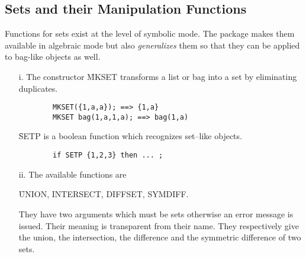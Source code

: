 \subsection{Sets and their Manipulation Functions}
Functions for sets exist at the level of symbolic mode. The
package makes them available in algebraic mode but also {\em generalizes}
them so that they can be applied to bag-like objects as well.
\begin{itemize}
\item[i.]
The constructor \f{MKSET} transforms a list or bag into a set by eliminating
duplicates.
\begin{verbatim}
        MKSET({1,a,a}); ==> {1,a}
        MKSET bag(1,a,1,a); ==> bag(1,a)
\end{verbatim}

\f{SETP} is a boolean function which recognizes set--like objects.
\begin{verbatim}
        if SETP {1,2,3} then ... ;
\end{verbatim}
\item[ii.]
The available functions are
\begin{center}
\f{UNION, INTERSECT, DIFFSET, SYMDIFF}.
\end{center}
They have two arguments which must be sets otherwise an error message
is issued.
Their meaning is transparent from their name. They respectively give the
union, the intersection, the difference and the symmetric difference of two
sets.
\end{itemize}
